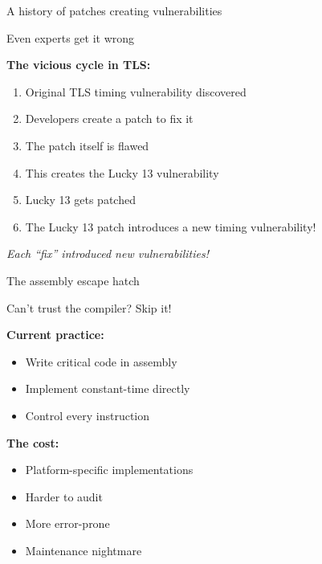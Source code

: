 \documentclass[aspectratio=169, lualatex, handout]{beamer}
\begin{document}
\begin{frame}{A history of patches creating vulnerabilities}
	\begin{center}
		\Large
		Even experts get it wrong
	\end{center}
	\vspace{1em}
	\textbf{The vicious cycle in TLS:}
	\begin{enumerate}
		\item Original TLS timing vulnerability discovered
		\item Developers create a patch to fix it
		\item The patch itself is flawed
		\item This creates the Lucky 13 vulnerability
		\item Lucky 13 gets patched
		\item The Lucky 13 patch introduces a new timing vulnerability!
	\end{enumerate}
	\vspace{1em}
	\begin{center}
		\textit{Each ``fix'' introduced new vulnerabilities!}
	\end{center}
\end{frame}

\begin{frame}{The assembly escape hatch}
	\begin{center}
		\Large
		Can't trust the compiler? Skip it!
	\end{center}
	\vspace{1em}
	\textbf{Current practice:}
	\begin{itemize}
		\item Write critical code in assembly
		\item Implement constant-time directly
		\item Control every instruction
	\end{itemize}
	\vspace{0.5em}
	\textbf{The cost:}
	\begin{itemize}
		\item Platform-specific implementations
		\item Harder to audit
		\item More error-prone
		\item Maintenance nightmare
	\end{itemize}
\end{frame}
\end{document}
